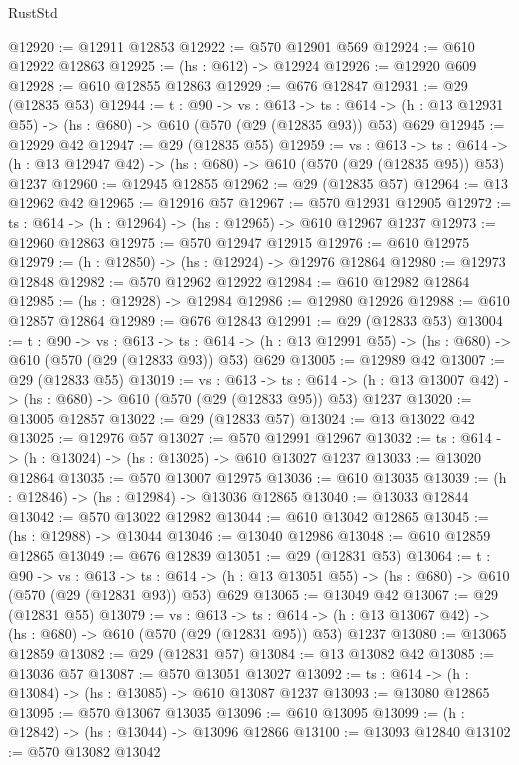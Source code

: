 \begin{lexlean}{RustStd}
\begin{coremodule}
@12920 := @12911 @12853
@12922 := @570 @12901 @569
@12924 := @610 @12922 @12863
@12925 := (hs : @612) -> @12924
@12926 := @12920 @609
@12928 := @610 @12855 @12863
@12929 := @676 @12847
@12931 := @29 (@12835 @53)
@12944 := {t : @90} ->
  {vs : @613} ->
  {ts : @614} -> (h : @13 @12931 @55) -> (hs : @680) -> @610 (@570 (@29 (@12835 @93)) @53) @629
@12945 := @12929 @42
@12947 := @29 (@12835 @55)
@12959 := {vs : @613} ->
  {ts : @614} -> (h : @13 @12947 @42) -> (hs : @680) -> @610 (@570 (@29 (@12835 @95)) @53) @1237
@12960 := @12945 @12855
@12962 := @29 (@12835 @57)
@12964 := @13 @12962 @42
@12965 := @12916 @57
@12967 := @570 @12931 @12905
@12972 := {ts : @614} -> (h : @12964) -> (hs : @12965) -> @610 @12967 @1237
@12973 := @12960 @12863
@12975 := @570 @12947 @12915
@12976 := @610 @12975
@12979 := (h : @12850) -> (hs : @12924) -> @12976 @12864
@12980 := @12973 @12848
@12982 := @570 @12962 @12922
@12984 := @610 @12982 @12864
@12985 := (hs : @12928) -> @12984
@12986 := @12980 @12926
@12988 := @610 @12857 @12864
@12989 := @676 @12843
@12991 := @29 (@12833 @53)
@13004 := {t : @90} ->
  {vs : @613} ->
  {ts : @614} -> (h : @13 @12991 @55) -> (hs : @680) -> @610 (@570 (@29 (@12833 @93)) @53) @629
@13005 := @12989 @42
@13007 := @29 (@12833 @55)
@13019 := {vs : @613} ->
  {ts : @614} -> (h : @13 @13007 @42) -> (hs : @680) -> @610 (@570 (@29 (@12833 @95)) @53) @1237
@13020 := @13005 @12857
@13022 := @29 (@12833 @57)
@13024 := @13 @13022 @42
@13025 := @12976 @57
@13027 := @570 @12991 @12967
@13032 := {ts : @614} -> (h : @13024) -> (hs : @13025) -> @610 @13027 @1237
@13033 := @13020 @12864
@13035 := @570 @13007 @12975
@13036 := @610 @13035
@13039 := (h : @12846) -> (hs : @12984) -> @13036 @12865
@13040 := @13033 @12844
@13042 := @570 @13022 @12982
@13044 := @610 @13042 @12865
@13045 := (hs : @12988) -> @13044
@13046 := @13040 @12986
@13048 := @610 @12859 @12865
@13049 := @676 @12839
@13051 := @29 (@12831 @53)
@13064 := {t : @90} ->
  {vs : @613} ->
  {ts : @614} -> (h : @13 @13051 @55) -> (hs : @680) -> @610 (@570 (@29 (@12831 @93)) @53) @629
@13065 := @13049 @42
@13067 := @29 (@12831 @55)
@13079 := {vs : @613} ->
  {ts : @614} -> (h : @13 @13067 @42) -> (hs : @680) -> @610 (@570 (@29 (@12831 @95)) @53) @1237
@13080 := @13065 @12859
@13082 := @29 (@12831 @57)
@13084 := @13 @13082 @42
@13085 := @13036 @57
@13087 := @570 @13051 @13027
@13092 := {ts : @614} -> (h : @13084) -> (hs : @13085) -> @610 @13087 @1237
@13093 := @13080 @12865
@13095 := @570 @13067 @13035
@13096 := @610 @13095
@13099 := (h : @12842) -> (hs : @13044) -> @13096 @12866
@13100 := @13093 @12840
@13102 := @570 @13082 @13042

\end{coremodule}
\end{lexlean}
